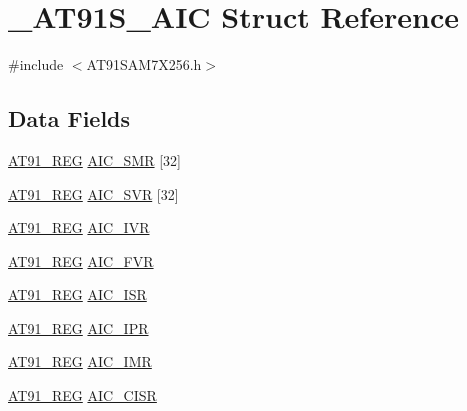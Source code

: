 \hypertarget{struct__AT91S__AIC}{\section{\-\_\-\-A\-T91\-S\-\_\-\-A\-I\-C Struct Reference}
\label{struct__AT91S__AIC}
}


{\ttfamily \#include $<$A\-T91\-S\-A\-M7\-X256.\-h$>$}

\subsection*{Data Fields}
\begin{DoxyCompactItemize}
\item 
\hyperlink{GCC_2ARM7__AT91SAM7S_2AT91SAM7X256_8h_a712ad5a1ac1bd02f3e95a7526c283ce1}{A\-T91\-\_\-\-R\-E\-G} \hyperlink{struct__AT91S__AIC_a8f67e50f87c9ec1296d138c8823956a9}{A\-I\-C\-\_\-\-S\-M\-R} \mbox{[}32\mbox{]}
\item 
\hyperlink{GCC_2ARM7__AT91SAM7S_2AT91SAM7X256_8h_a712ad5a1ac1bd02f3e95a7526c283ce1}{A\-T91\-\_\-\-R\-E\-G} \hyperlink{struct__AT91S__AIC_aab87ea86f3a65a32f8d4c788cc8c56ae}{A\-I\-C\-\_\-\-S\-V\-R} \mbox{[}32\mbox{]}
\item 
\hyperlink{GCC_2ARM7__AT91SAM7S_2AT91SAM7X256_8h_a712ad5a1ac1bd02f3e95a7526c283ce1}{A\-T91\-\_\-\-R\-E\-G} \hyperlink{struct__AT91S__AIC_af105953c155379836fce666eef37501b}{A\-I\-C\-\_\-\-I\-V\-R}
\item 
\hyperlink{GCC_2ARM7__AT91SAM7S_2AT91SAM7X256_8h_a712ad5a1ac1bd02f3e95a7526c283ce1}{A\-T91\-\_\-\-R\-E\-G} \hyperlink{struct__AT91S__AIC_accca387631438422260c8a8652800eed}{A\-I\-C\-\_\-\-F\-V\-R}
\item 
\hyperlink{GCC_2ARM7__AT91SAM7S_2AT91SAM7X256_8h_a712ad5a1ac1bd02f3e95a7526c283ce1}{A\-T91\-\_\-\-R\-E\-G} \hyperlink{struct__AT91S__AIC_a3634430d76ed81bcbd9f0b04f9c0907e}{A\-I\-C\-\_\-\-I\-S\-R}
\item 
\hyperlink{GCC_2ARM7__AT91SAM7S_2AT91SAM7X256_8h_a712ad5a1ac1bd02f3e95a7526c283ce1}{A\-T91\-\_\-\-R\-E\-G} \hyperlink{struct__AT91S__AIC_a9ae6e5e104c8f5a405a1792e5126236a}{A\-I\-C\-\_\-\-I\-P\-R}
\item 
\hyperlink{GCC_2ARM7__AT91SAM7S_2AT91SAM7X256_8h_a712ad5a1ac1bd02f3e95a7526c283ce1}{A\-T91\-\_\-\-R\-E\-G} \hyperlink{struct__AT91S__AIC_a2eecd9e74afeac555e7b90c3594bc910}{A\-I\-C\-\_\-\-I\-M\-R}
\item 
\hyperlink{GCC_2ARM7__AT91SAM7S_2AT91SAM7X256_8h_a712ad5a1ac1bd02f3e95a7526c283ce1}{A\-T91\-\_\-\-R\-E\-G} \hyperlink{struct__AT91S__AIC_ac1e7c71a265c9818fe96b59796aaed7e}{A\-I\-C\-\_\-\-C\-I\-S\-R}

\end{DoxyCompactItemize}
